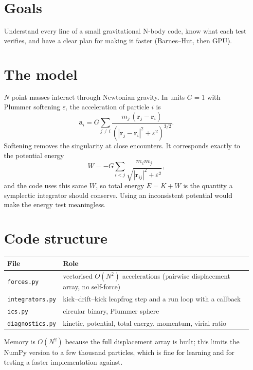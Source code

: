 


\section*{Goals}
Understand every line of a small gravitational N-body code, know what each test verifies, and have a clear plan for making it faster (Barnes--Hut, then GPU).

\section{The model}
$N$ point masses interact through Newtonian gravity. In units $G=1$ with Plummer softening $\varepsilon$, the acceleration of particle $i$ is
\[
\mathbf a_i=G\sum_{j\ne i}\frac{m_j\,(\mathbf r_j-\mathbf r_i)}{\left(|\mathbf r_j-\mathbf r_i|^2+\varepsilon^2\right)^{3/2}}.
\]
Softening removes the singularity at close encounters. It corresponds exactly to the potential energy
\[
W=-G\sum_{i<j}\frac{m_im_j}{\sqrt{|\mathbf r_{ij}|^2+\varepsilon^2}},
\]
and the code uses this same $W$, so total energy $E=K+W$ is the quantity a symplectic integrator should conserve. Using an inconsistent potential would make the energy test meaningless.

\section{Code structure}
\begin{center}
\begin{tabular}{@{}ll@{}}
\toprule
File & Role \\ \midrule
\texttt{forces.py} & vectorised $O(N^2)$ accelerations (pairwise displacement array, no self-force) \\
\texttt{integrators.py} & kick--drift--kick leapfrog step and a run loop with a callback \\
\texttt{ics.py} & circular binary, Plummer sphere \\
\texttt{diagnostics.py} & kinetic, potential, total energy, momentum, virial ratio \\
\bottomrule
\end{tabular}
\end{center}
Memory is $O(N^2)$ because the full displacement array is built; this limits the NumPy version to a few thousand particles, which is fine for learning and for testing a faster implementation against.

